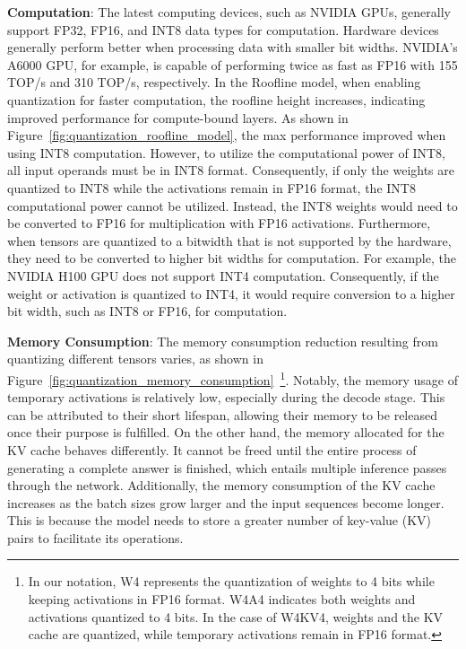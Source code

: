 \textbf{Computation}: 
The latest computing devices, such as NVIDIA GPUs, generally support FP32, FP16, and INT8 data types for computation. Hardware devices generally perform better when processing data with smaller bit widths. NVIDIA's A6000 GPU, for example, is capable of performing twice as fast as FP16 with 155 TOP/s and 310 TOP/s, respectively.
In the Roofline model, when enabling quantization for faster computation, the roofline height increases, indicating improved performance for compute-bound layers. 
As shown in Figure~\ref{fig:quantization_roofline_model}, the max performance improved when using INT8 computation.
However, to utilize the computational power of INT8, all input operands must be in INT8 format. Consequently, if only the weights are quantized to INT8 while the activations remain in FP16 format, the INT8 computational power cannot be utilized. Instead, the INT8 weights would need to be converted to FP16 for multiplication with FP16 activations.
Furthermore, when tensors are quantized to a bitwidth that is not supported by the hardware, they need to be converted to higher bit widths for computation. For example, the NVIDIA H100 GPU does not support INT4 computation. Consequently, if the weight or activation is quantized to INT4, it would require conversion to a higher bit width, such as INT8 or FP16, for computation.

\textbf{Memory Consumption}: The memory consumption reduction resulting from quantizing different tensors varies, as shown in Figure~\ref{fig:quantization_memory_consumption}~\footnote{In our notation, W4 represents the quantization of weights to 4 bits while keeping activations in FP16 format. W4A4 indicates both weights and activations quantized to 4 bits. In the case of W4KV4, weights and the KV cache are quantized, while temporary activations remain in FP16 format.}. Notably, the memory usage of temporary activations is relatively low, especially during the decode stage. This can be attributed to their short lifespan, allowing their memory to be released once their purpose is fulfilled.
On the other hand, the memory allocated for the KV cache behaves differently. It cannot be freed until the entire process of generating a complete answer is finished, which entails multiple inference passes through the network. Additionally, the memory consumption of the KV cache increases as the batch sizes grow larger and the input sequences become longer. This is because the model needs to store a greater number of key-value (KV) pairs to facilitate its operations.

